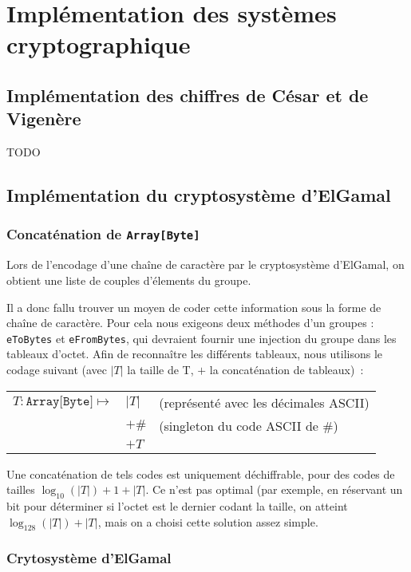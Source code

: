 \documentclass[11pt]{article} %
\begin{document}
\section{Implémentation des systèmes cryptographique}

\subsection{Implémentation des chiffres de César et de Vigenère}

TODO

\subsection{Implémentation du cryptosystème d'ElGamal}

\subsubsection{Concaténation de \texttt{Array[Byte]}}

Lors de l'encodage d'une chaîne de caractère par le cryptosystème d'ElGamal, on obtient une liste de couples d'élements du groupe.

Il a donc fallu trouver un moyen de coder cette information sous la forme de chaîne de caractère. %
Pour cela nous exigeons deux méthodes d'un groupes : \texttt{eToBytes} et \texttt{eFromBytes}, qui devraient fournir une injection du groupe dans les tableaux d'octet. Afin de reconnaître les différents tableaux, nous utilisons le codage suivant (avec $|T|$ la taille de T, $+$ la concaténation de tableaux)~:\\
\begin{tabular}{rll}
  $T:\texttt{Array[Byte]} \mapsto$ & $|T|$ & (représenté avec les décimales ASCII) \\
  & $+  \#$ & (singleton du code ASCII de \#)\\
  & $+ T$ & \\
\end{tabular}

Une concaténation de tels codes est uniquement déchiffrable, pour des codes de tailles $\log_{10}(|T|) + 1 + |T|$. Ce n'est pas optimal (par exemple, en réservant un bit pour déterminer si l'octet est le dernier codant la taille, on atteint $\log_{128}(|T|) + |T|$, mais on a choisi cette solution assez simple.

\subsubsection{Crytosystème d'ElGamal}
\end{document}
